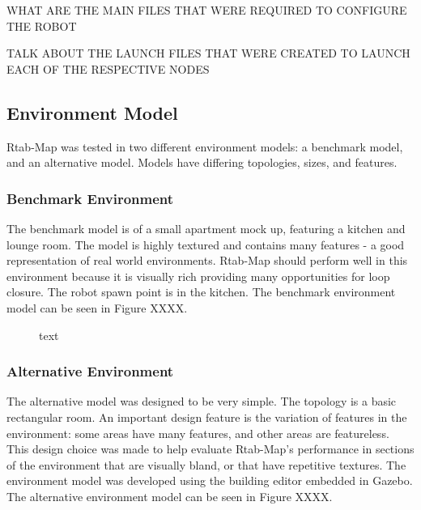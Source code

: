 \documentclass[a4paper]{article}
\begin{document}
\clearpage


WHAT ARE THE MAIN FILES THAT WERE REQUIRED TO CONFIGURE THE ROBOT

TALK ABOUT THE LAUNCH FILES THAT WERE CREATED TO LAUNCH EACH OF THE RESPECTIVE NODES


\subsection{Environment Model}
Rtab-Map was tested in two different environment models: a benchmark model, and an alternative model. Models have differing topologies, sizes, and features. 

\subsubsection{Benchmark Environment}
The benchmark model is of a small apartment mock up, featuring a kitchen and lounge room. The model is highly textured and contains many features - a good representation of real world environments. Rtab-Map should perform well in this environment because it is visually rich providing many opportunities for loop closure. The robot spawn point is in the kitchen. The benchmark environment model can be seen in Figure XXXX.

\begin{figure}[h]
\centering
{}
\caption{text}
\end{figure}

\subsubsection{Alternative Environment}
The alternative model was designed to be very simple. The topology is a basic rectangular room. An important design feature is the variation of features in the environment: some areas have many features, and other areas are featureless. This design choice was made to help evaluate Rtab-Map's performance in sections of the environment that are visually bland, or that have repetitive textures. The environment model was developed using the building editor embedded in Gazebo. The alternative environment model can be seen in Figure XXXX.
\end{document}
